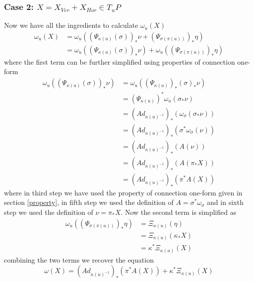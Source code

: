 \documentclass[12pt]{article}
\begin{document}
\subsubsection{Case 2: $X = X_{Ver} + X_{Hor} \in T_{u}P$}
Now we have all the ingredients to calculate $\omega_{u}(X)$ \\
\begin{align*}
    \omega_{u}(X) &= \omega_{u}((\Psi_{\kappa(u)}(\sigma))_{\ast}\nu + (\Psi_{\sigma(\pi(u))})_{\ast}\eta) \\
                  &= \omega_{u}((\Psi_{\kappa(u)}(\sigma))_{\ast}\nu) + \omega_{u}((\Psi_{\sigma(\pi(u))})_{\ast}\eta)
\end{align*}
where the first term can be further simplified using properties of connection one-form \\
\begin{align*}
\omega_{u}((\Psi_{\kappa(u)}(\sigma))_{\ast}\nu)
              &= \omega_{u}((\Psi_{\kappa(u)})_{\ast}(\sigma)_{\ast}\nu) \\
              &= (\Psi_{\kappa(u)})^{\ast}\omega_{u}(\sigma_{\ast}\nu) \\
              &= (Ad_{\kappa(u)^{-1}})_{\ast}(\omega_{\sigma}(\sigma_{\ast}\nu)) \\
              &= (Ad_{\kappa(u)^{-1}})_{\ast}(\sigma^{\ast}\omega_{\sigma}(\nu)) \\
              &= (Ad_{\kappa(u)^{-1}})_{\ast}(A(\nu)) \\
              &= (Ad_{\kappa(u)^{-1}})_{\ast}(A(\pi_{\ast}X)) \\
              &= (Ad_{\kappa(u)^{-1}})_{\ast}(\pi^{\ast}A(X))
\end{align*} where in third step we have used the property of connection one-form given in section \ref{property}, in fifth step we used the definition of $A = \sigma^{\ast}\omega_{\sigma}$ and in sixth step we used the definition of $\nu = \pi_{\ast}X $. Now the second term is simplified as \\ 
\begin{align*}
    \omega_{u}((\Psi_{\sigma(\pi(u))})_{\ast}\eta) &= \Xi_{\kappa(u)}(\eta) \\
                                                   &= \Xi_{\kappa(u)}(\kappa_{\ast}X) \\
                                                   &= \kappa^{\ast}\Xi_{\kappa(u)}(X)
\end{align*} combining the two terms we recover the equation
\begin{equation}
    \omega(X) = (Ad_{\kappa(u)^{-1}})_{\ast}(\pi^{\ast}A(X)) + \kappa^{\ast}\Xi_{\kappa(u)}(X)
\end{equation}
\end{document}
